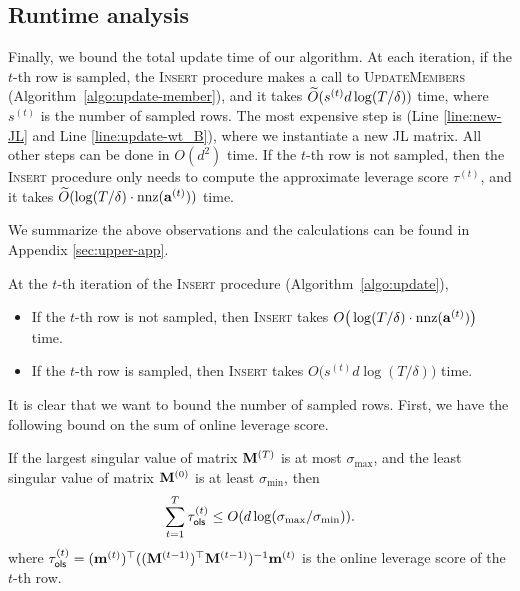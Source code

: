 \subsection{Runtime analysis}
\label{sec:time}


Finally, we bound the total update time of our algorithm. 
At each iteration, if the $t$-th row is sampled, the \textsc{Insert} procedure makes a call to \textsc{UpdateMembers} (Algorithm~\ref{algo:update-member}), and it takes $\widetilde{O}(s^{(t)} d \log(T/\delta))$ time, where $s^{(t)} $ is the number of sampled rows. The most expensive step is (Line \ref{line:new-JL} and Line \ref{line:update-wt_B}), where we instantiate a new JL matrix. All other steps can be done in $O(d^2)$ time.
If the $t$-th row is not sampled, then the \textsc{Insert} procedure only needs to compute the approximate leverage score $\tau^{(t)}$, and it takes $\widetilde{O}(\log(T/\delta) \cdot \operatorname{nnz}(\mathbf{a}^{(t)}))$ time. 

We summarize the above observations and the calculations can be found in Appendix \ref{sec:upper-app}.
\begin{lemma}\label{lem:worst_case_query_time}
At the $t$-th iteration of the \textsc{Insert} procedure (Algorithm~\ref{algo:update}),
\begin{itemize}
    \item If the $t$-th row is not sampled, then \textsc{Insert} takes $O\big(\log(T/\delta) \cdot \operatorname{nnz}(\mathbf{a}^{(t)})\big)$ time.
    \item If the $t$-th row is sampled, then \textsc{Insert} takes $O\big(s^{(t)}d \log(T/\delta)\big)$ time.
\end{itemize}
\end{lemma}





It is clear that we want to bound the number of sampled rows. First, we have the following bound on the sum of online leverage score.
\begin{lemma}\label{lem:online_leverage_score_sum}
If the largest singular value of matrix $\mathbf{M}^{(T)}$ is at most $\sigma_{\max}$, and the least singular value of matrix $\mathbf{M}^{(0)}$ is at least $\sigma_{\min}$, then
\[
\sum_{t=1}^T \tau_{\mathsf{ols}}^{(t)} \leq O(d \log(\sigma_{\max}/ \sigma_{\min})).
\]
where $\tau_{\mathsf{ols}}^{(t)} = (\mathbf{m}^{(t)})^{\top} ((\mathbf{M}^{(t-1)})^\top \mathbf{M}^{(t-1)})^{-1}\mathbf{m}^{(t)}$ is the online leverage score of the $t$-th row.
\end{lemma}

